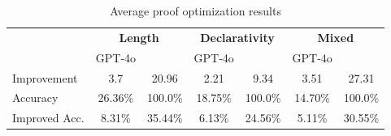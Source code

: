 \begin{table}[h]
\caption{Average proof optimization results}
\label{tab:main-avg-transposed}
\centering
\small
\begin{tabular}{l|cc|cc|cc}
\toprule
 & \multicolumn{2}{c|}{\textbf{Length}}
 & \multicolumn{2}{c|}{\textbf{Declarativity}}
 & \multicolumn{2}{c}{\textbf{Mixed}} \\
 & GPT‑4o & \methodname{}
 & GPT‑4o & \methodname{}
 & GPT‑4o & \methodname{} \\
\midrule
Improvement          & 3.7        & 20.96
                     & 2.21       & 9.34
                     & 3.51       & 27.31     \\
Accuracy             & 26.36\%    & 100.0\%
                     & 18.75\%    & 100.0\%
                     & 14.70\%    & 100.0\%   \\
Improved Acc.        & 8.31\%     & 35.44\%
                     & 6.13\%     & 24.56\%
                     & 5.11\%     & 30.55\%   \\
\bottomrule
\end{tabular}
\end{table}


